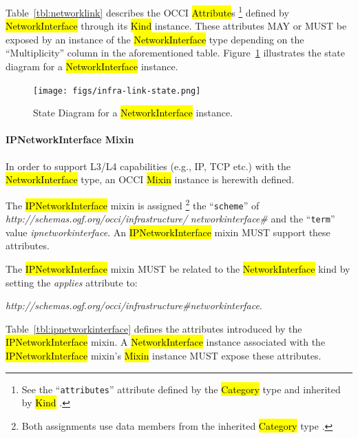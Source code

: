 \documentclass[10pt,a4paper]{article}
\begin{document}
Table~\ref{tbl:networklink} describes the OCCI \hl{Attribute}s%
\footnote{See the ``{\tt attributes}'' attribute defined by the
  \hl{Category} type and inherited by \hl{Kind} \cite{occi:core}.}
defined by \hl{NetworkInterface} through its \hl{Kind} instance. These
attributes MAY or MUST be exposed by an instance of the \hl{NetworkInterface} type
depending on the ``Multiplicity'' column in the aforementioned table.
Figure~\ref{fig:networklink_state} illustrates the state
diagram for a \hl{NetworkInterface} instance.

\begin{figure}[!h]
	\centering
	\texttt{[image: figs/infra-link-state.png]}
	\caption{State Diagram for a \hl{NetworkInterface} instance.}
	\label{fig:networklink_state}
\end{figure}

\paragraph{IPNetworkInterface Mixin}
In order to support L3/L4 capabilities (e.g., IP, TCP etc.) with the
\hl{NetworkInterface} type, an OCCI \hl{Mixin} instance is herewith
defined.

The \hl{IPNetworkInterface} mixin is assigned%
\footnote{Both assignments use data members from the inherited \hl{Category}
type \cite{occi:core}.}
the ``{\tt scheme}'' of
\textit{http://schemas.ogf.org/occi/infrastructure/} \textit{networkinterface\#} and the ``{\tt term}'' value
\textit{ipnetworkinterface}.
An \hl{IPNetworkInterface} mixin MUST support these attributes.

The \hl{IPNetworkInterface} mixin MUST be related to the \hl{NetworkInterface} kind
by setting the \textit{applies} attribute to:

\textit{http://schemas.ogf.org/occi/infrastructure\#networkinterface}.

Table~\ref{tbl:ipnetworkinterface} defines the attributes introduced by
the \hl{IPNetworkInterface} mixin.  A \hl{NetworkInterface} instance
associated with the \hl{IPNetworkInterface} mixin's \hl{Mixin} instance
MUST expose these attributes.
\end{document}
